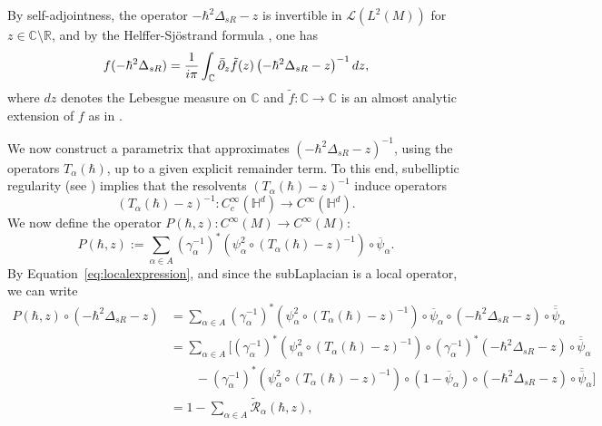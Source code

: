 \documentclass[12pt,a4paper]{amsart}
\theoremstyle{plain}
\theoremstyle{definition}
\theoremstyle{remark}
\numberwithin{equation}{section}
\theoremstyle{definition}
\def\R{{\mathbb R}}%
\def\C{{\mathbb C}}%
\def \Heis{\mathbb{H}}
\numberwithin{equation}{section}
\begin{document}
\vspace{0.25cm}

By self-adjointness, the operator $-\hbar^2\Delta_{sR}-z$ is invertible in $\mathscr{L}(L^2(M))$ for $z\in \C\setminus\R$, and by the Helffer-Sjöstrand formula \cite[Theorem 14.8]{Zwo}, one has
\begin{equation*}
    f(-\hbar^2\Delta_{sR}) = \frac{1}{i\pi}\int_\C \Bar{\partial}_z \tilde{f}(z) \left(-\hbar^2\Delta_{sR}-z\right)^{-1}dz,
\end{equation*}
where $dz$ denotes the Lebesgue measure on $\C$ and $\tilde{f}:\C\rightarrow \C$ is an almost analytic extension of $f$ as in \cite[Theorem 3.6]{Zwo}.

We now construct a parametrix that approximates $(-\hbar^2\Delta_{sR}-z)^{-1}$, using the operators $T_\alpha(\hbar)$, up to a given explicit remainder term. To this end, subelliptic regularity (see \cite[Lemma 6.9]{FM}) implies that the resolvents $(T_\alpha(\hbar)-z)^{-1}$ induce operators
\begin{equation*}
    (T_\alpha(\hbar)-z)^{-1} : C_c^\infty(\Heis^d)\rightarrow C^\infty(\Heis^d).
\end{equation*}
We now define the operator $P(\hbar,z) : C^\infty(M)\rightarrow C^\infty(M)$:
\begin{equation*}
    P(\hbar,z) := \sum_{\alpha\in A} (\gamma_\alpha^{-1})^* \left(\psi_\alpha^2\circ (T_\alpha(\hbar)-z)^{-1}\right) \circ \overline{\psi}_\alpha.
\end{equation*}
By Equation~\eqref{eq:localexpression}, and since the subLaplacian is a local operator, we can write
\begin{equation*}
    \begin{aligned}
        P(\hbar,z) \circ (-\hbar^2\Delta_{sR}-z) 
        &= \sum_{\alpha\in A}  (\gamma_\alpha^{-1})^* \left(\psi_\alpha^2\circ (T_\alpha(\hbar)-z)^{-1}\right) \circ \overline{\psi}_\alpha \circ (-\hbar^2 \Delta_{sR}-z)\circ \overline{\overline{\psi}}_\alpha\\
        &= \sum_{\alpha\in A}\Big[(\gamma_\alpha^{-1})^* \left(\psi_\alpha^2\circ (T_\alpha(\hbar)-z)^{-1}\right) \circ (\gamma_\alpha^{-1})^* (-\hbar^2 \Delta_{sR}-z)\circ \overline{\overline{\psi}}_\alpha \\
        &\qquad -(\gamma_\alpha^{-1})^* \left(\psi_\alpha^2\circ (T_\alpha(\hbar)-z)^{-1}\right) \circ (1-\overline{\psi}_\alpha) \circ (-\hbar^2 \Delta_{sR}-z)\circ \overline{\overline{\psi}}_\alpha\Big]\\
        &= 1 - \sum_{\alpha\in A} \tilde{\mathcal{R}}_\alpha(\hbar,z),
    \end{aligned}
\end{equation*}
\end{document}
